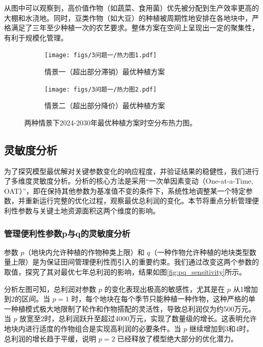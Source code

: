 从图中可以观察到，高价值作物（如蔬菜、食用菌）优先被分配到生产效率更高的大棚和水浇地。同时，豆类作物（如大豆）的种植被周期性地安排在各地块中，严格满足了三年至少种植一次的农艺要求。整体方案在空间上呈现出一定的聚集性，有利于规模化管理。

\begin{figure}[H]
    \centering
    \begin{subfigure}[b]{0.9\textwidth}
        \centering
        \texttt{[image: figs/3问题一/热力图1.pdf]}
        \caption{情景一（超出部分滞销）最优种植方案}
        \label{fig:heatmap_case1}
    \end{subfigure}
    \vfill
    \begin{subfigure}[b]{0.9\textwidth}
        \centering
        \texttt{[image: figs/3问题一/热力图2.pdf]}
        \caption{情景二（超出部分降价）最优种植方案}
        \label{fig:heatmap_case2}
    \end{subfigure}
    \caption{两种情景下2024-2030年最优种植方案时空分布热力图。}
    \label{fig:heatmap}
\end{figure}



\subsection{灵敏度分析}

为了探究模型最优解对关键参数变化的响应程度，并验证结果的稳健性，我们进行了多维度灵敏度分析。分析的核心方法是采用“一次单因素变动（One-at-a-Time, OAT）”，即在保持其他参数为基准值不变的条件下，系统性地调整某一个特定参数，并重新运行完整的优化过程，观察最优总利润的变化。本节将重点分析管理便利性参数与关键土地资源面积这两个维度的影响。

\subsubsection{管理便利性参数p与q的灵敏度分析}

参数 $p$（地块内允许种植的作物种类上限）和 $q$（一种作物允许种植的地块类型数量上限）是为保证田间管理便利性而引入的重要约束。我们通过改变这两个参数的取值，探究了其对最优七年总利润的影响，结果如图\ref{fig:pq_sensitivity}所示。

分析左图可知，总利润对参数 $p$ 的变化表现出极高的敏感性，尤其是在 $p$ 从1增加到2的区间。当 $p=1$ 时，每个地块在每个季节只能种植一种作物，这种严格的单一种植模式极大地限制了轮作和作物搭配的灵活性，导致总利润仅为约500万元。当 $p$ 放宽至2时，总利润跃升至超过4000万元，实现了数量级的增长。这表明允许地块内进行适度的作物组合是实现高利润的必要条件。当 $p$ 继续增加到3和4时，总利润的增长趋于平缓，说明 $p=2$ 已经释放了模型绝大部分的优化潜力。


